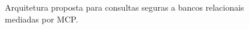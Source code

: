 \begin{figure}[htbp]
\caption{Arquitetura proposta para consultas seguras a bancos relacionais mediadas por MCP.}
\label{fig:arquitetura-mcp-consultas-seguras}
\end{figure}
